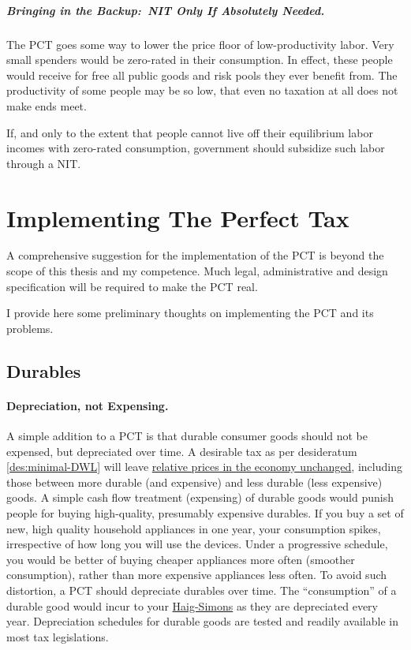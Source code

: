 \subparagraph{Bringing in the Backup:~NIT Only If Absolutely Needed.}
The PCT goes some way to lower the price floor of low-productivity labor.
Very small spenders would be zero-rated in their consumption.
In effect, these people would receive for free all public goods and risk pools they ever benefit from.
The productivity of some people may be so low, that even no taxation at all does not make ends meet.

If, and only to the extent that people cannot live off their equilibrium labor incomes with zero-rated consumption, government should subsidize such labor through a NIT.

\section{Implementing The Perfect Tax}
	\label{sec:Implementation}
A comprehensive suggestion for the implementation of the PCT is beyond the scope of this thesis and my competence.
Much legal, administrative and design specification will be required to make the PCT real.

I provide here some preliminary thoughts on implementing the PCT and its problems.

\subsection{Durables}

\paragraph{Depreciation, not Expensing.}
A simple addition to a PCT is that durable consumer goods should not be expensed, but depreciated over time.
A desirable tax as per desideratum \ref{des:minimal-DWL} will leave \hyperref[des:minimal-DWL]{relative prices in the economy unchanged}, including those between more durable (and expensive) and less durable (less expensive) goods.
A simple cash flow treatment (expensing) of durable goods would punish people for buying high-quality, presumably expensive durables.
If you buy a set of new, high quality household appliances in one year, your consumption spikes, irrespective of how long you will use the devices.
Under a progressive schedule, you would be better of buying cheaper appliances more often (smoother consumption), rather than more expensive appliances less often.
To avoid such distortion, a PCT should depreciate durables over time.
The ``consumption'' of a durable good would incur to your \hyperref[eq:HaigSimonsPCT]{Haig-Simons} as they are depreciated every year.
Depreciation schedules for durable goods are tested and readily available in most tax legislations.

